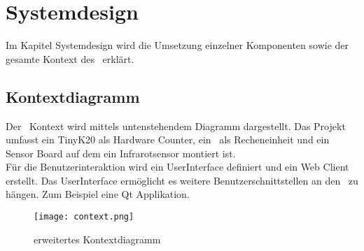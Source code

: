 \section{Systemdesign}
    Im Kapitel Systemdesign wird die Umsetzung einzelner Komponenten sowie der gesamte Kontext des \documenttitle\ erklärt.
        \subsection{Kontextdiagramm}
        Der \documenttitle\ Kontext wird mittels untenstehendem Diagramm dargestellt. Das Projekt umfasst ein TinyK20 als Hardware Counter, ein \rpi\ als Recheneinheit und ein Sensor Board auf dem ein Infrarotsensor montiert ist.\\
        Für die Benutzerinteraktion wird ein UserInterface definiert und ein Web Client erstellt. Das UserInterface ermöglicht es weitere Benutzerschnittstellen an den \documenttitle\ zu hängen. Zum Beispiel eine Qt Applikation.
        \begin{figure}[H]
            \centering
            \texttt{[image: context.png]}
            \caption{erweitertes Kontextdiagramm}
            \label{fig:kontext}
        \end{figure}


        \clearpage
        
        
        \clearpage
		
		
        \clearpage
        
        \clearpage
        
        \clearpage
        
        \clearpage
		